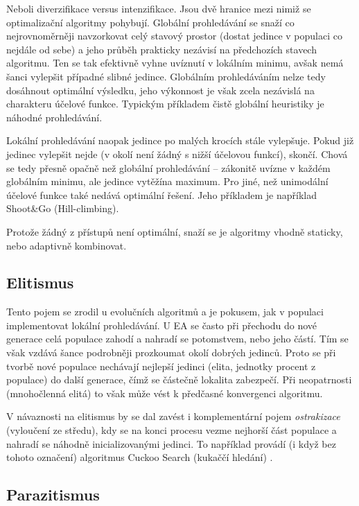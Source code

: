 Neboli diverzifikace versus intenzifikace. Jsou dvě hranice mezi nimiž se optimalizační algoritmy pohybují. Globální prohledávání se snaží co nejrovnoměrněji navzorkovat celý stavový prostor (dostat jedince v populaci co nejdále od sebe) a jeho průběh prakticky nezávisí na předchozích stavech algoritmu. Ten se tak efektivně vyhne uvíznutí v lokálním minimu, avšak nemá šanci vylepšit případné slibné jedince. Globálním prohledáváním nelze tedy dosáhnout optimální výsledku, jeho výkonnost je však zcela nezávislá na charakteru účelové funkce. Typickým příkladem čistě globální heuristiky je náhodné prohledávání.

Lokální prohledávání naopak jedince po malých krocích stále vylepšuje. Pokud již jedinec vylepšit nejde (v okolí není žádný s nižší účelovou funkcí), skončí. Chová se tedy přesně opačně než globální prohledávání -- zákonitě uvízne v každém globálním minimu, ale jedince \bq vytěží\eq na maximum. Pro jiné, než unimodální účelové funkce také nedává optimální řešení. Jeho příkladem je například Shoot\&Go (Hill-climbing).

Protože žádný z přístupů není optimální, snaží se je algoritmy vhodně staticky, nebo adaptivně kombinovat.

\subsection{Elitismus}

Tento pojem se zrodil u evolučních algoritmů a je pokusem, jak v populaci implementovat lokální prohledávání. U EA se často při přechodu do nové generace celá populace zahodí a nahradí se potomstvem, nebo jeho částí. Tím se však vzdává šance podrobněji prozkoumat okolí dobrých jedinců. Proto se při tvorbě nové populace nechávají nejlepší jedinci (elita, jednotky procent z populace) do další generace, čímž se částečně lokalita zabezpečí. Při neopatrnosti (mnohočlenná elitá) to však může vést k předčasné konvergenci algoritmu.

V návaznosti na elitismus by se dal zavést i komplementární pojem \emph{ostrakizace} (\bq vyloučení ze středu\eq), kdy se na konci procesu vezme nejhorší část populace a nahradí se náhodně inicializovanými jedinci. To například provádí (i když bez tohoto označení) algoritmus Cuckoo Search (kukaččí hledání) \cite{cuckoo}.

\subsection{Parazitismus}

